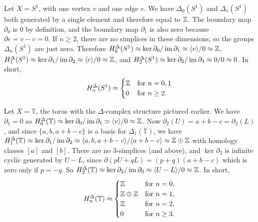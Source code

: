 \begin{example}
    Let $X=S^1 $, with one vertex $v$ and one edge $e$. We have $\Delta_0(S^1 ) $ and $\Delta_1(S^1 )$ both generated by a single element and therefore equal to $\mathbb{Z}$. The boundary map $\partial_0 $ is 0 by definition, and the boundary map $\partial_1$ is also zero because $\partial e=v-v=0$. If $n\geq 2$, there are no simplices in these dimensions, so the groups $\Delta _n (S^1 )$ are just zero. Therefore $H_0^{\Delta}(S^1 ) \approx \ker \partial_0 / \operatorname{im} \partial_1\approx \langle v \rangle /0 \approx \mathbb{Z}  $, $H_1^{\Delta}(S^1 )\approx \ker \partial_1/\operatorname{im} \partial_2 \approx \langle e \rangle /0 \approx \mathbb{Z} $, and $H_{2}^{\Delta}(S^1 )\approx \ker \partial _2 /\operatorname{im} \partial _3\approx 0/ 0\approx 0$. In short,
    \[ H_n ^{\Delta}(S^1 )\approx
    \begin{cases}
        \mathbb{Z} &\text{for} \  n=0,1\\
        0 & \text{for} \ n\geq 2.
    \end{cases}
    \] 
\end{example}
\begin{example}
    Let $X=\mathbb{T}$, the torus with the $\Delta$-complex structure pictured earlier. We have $\partial_1=0$ so $H_0 ^{\Delta}(\mathbb{T}) \approx \ker \partial_0 / \operatorname{im} \partial_1 \simeq \langle v \rangle /0\approx \mathbb{Z}$. Now $\partial_2(U)=a+b-c=\partial_2(L)  $, and since $\{a,b,a+b-c\} $ is a basis for $\Delta_1(\mathbb{T})$, we have $H_1^{\Delta}(\mathbb{T})\approx \ker \partial_1 / \operatorname{im} \partial_2\approx \langle a,b,a+b-c \rangle / \langle a+b-c \rangle  \approx \mathbb{Z}\oplus \mathbb{Z} $ with homology classes $[a]$ and $[b]$. There are no 3-simplices (and above), and $\ker \partial_2 $ is infinite cyclic generated by $U-L$, since $\partial (pU+qL)=(p+q)(a+b-c)$ which is zero only if $p=-q$. So $H_2^{\Delta}(\mathbb{T})\approx \ker \partial_2 / \operatorname{im} \partial_3\approx \langle U-L \rangle / 0\approx \mathbb{Z} $. In short, \[
        H_n ^{\Delta}(\mathbb{T}) \approx 
        \begin{cases}
            \mathbb{Z} & \text{for} \ n=0,\\
            \mathbb{Z}\oplus \mathbb{Z} &  \text{for} \ n=1,\\
            \mathbb{Z} & \text{for} \ n=2,\\
            0& \text{for} \ n\geq 3.
        \end{cases}
    \] 
\end{example}

